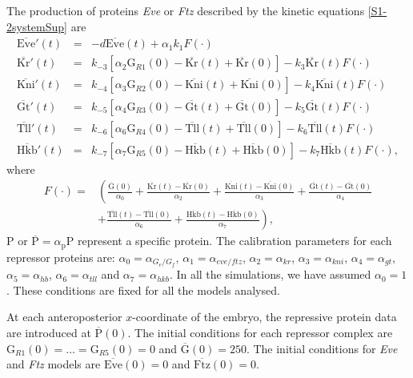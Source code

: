 \documentclass[final,authoryear, 5p, times]{elsarticle}
\begin{document}
The production of proteins \textit{Eve} or \textit{Ftz} described by the kinetic equations \eqref{S1-2systemSup} are
\scriptsize{ $$
\begin{array}{lcl}
    \overline{\text{Eve}}'(t) &= & -d \overline{\text{Eve}}(t) + \alpha _1 k_1 F(\cdot)\\
                  \overline{\text{Kr}}'(t)&=&k_{-3} \left[\alpha _2 \text{G}_{R1}(0)-\overline{\text{Kr}}(t)+\overline{\text{Kr}}(0)\right]-k_3 \overline{\text{Kr}}(t) F(\cdot) \\[5pt]
                          \overline{\text{Kni}}'(t)&=&k_{-4} \left[\alpha_3 \text{G}_{R2}(0)-\overline{\text{Kni}}(t)+\overline{\text{Kni}}(0)\right]-k_4 \overline{\text{Kni}}(t)F(\cdot)\\[5pt]
\overline{\text{Gt}}'(t)&=&k_{-5} \left[\alpha_4 \text{G}_{R3}(0)-\overline{\text{Gt}}(t)+\overline{\text{Gt}}(0)\right]-k_5 \overline{\text{Gt}}(t) F(\cdot)\\[5pt]
        \overline{\text{Tll}}'(t)&=&k_{-6} \left[\alpha_6 \text{G}_{R4}(0)-\overline{\text{Tll}}(t)+\overline{\text{Tll}}(0)\right]-k_6 \overline{\text{Tll}}(t) F(\cdot)\\[5pt]
        \overline{\text{Hkb}}'(t)&=&k_{-7} \left[\alpha_7 \text{G}_{R5}(0)-\overline{\text{Hkb}}(t)+\overline{\text{Hkb}}(0)\right]-k_7 \overline{\text{Hkb}}(t) F(\cdot) ,
\end{array}
$$ }
where
\scriptsize{$$
\begin{array}{ll}
F(\cdot)= & \left(\frac{\overline{\text{G}}(0)}{\alpha_0}+\frac{\overline{\text{Kr}}(t)-\overline{\text{Kr}}(0)}{\alpha_2}+\frac{\overline{\text{Kni}}(t)-\overline{\text{Kni}}(0)}{\alpha_3}+\frac{\overline{\text{Gt}}(t)-\overline{\text{Gt}}(0)}{\alpha_4}\right. \\ & \left. +\frac{\overline{\text{Tll}}(t)-\overline{\text{Tll}}(0)}{\alpha_6}+\frac{\overline{\text{Hkb}}(t)-\overline{\text{Hkb}}(0)}{\alpha_7}  \right),
\end{array}
$$}
P or  $\overline{\text{P}}=\alpha_{\text{p}}\text{P}$ represent a specific protein. The calibration parameters  for each repressor proteins are: $\alpha_0=\alpha_{G_e/G_f}$, $\alpha_1=\alpha_{eve/ftz}$, $\alpha_2=\alpha_{kr}$, $\alpha_3=\alpha_{kni}$, $\alpha_4=\alpha_{gt}$, $\alpha_5=\alpha_{hb}$, $\alpha_6=\alpha_{tll}$ and $\alpha_7=\alpha_{hkb}$. 
In all the simulations, we have assumed $\alpha_0=1$. These conditions are fixed for all the models analysed.

At each anteroposterior $x$-coordinate of the embryo, the repressive protein data are introduced at $\overline{\text{P}}(0)$. The initial conditions for each repressor complex are $\text{G}_{R1}(0)=\ldots =\text{G}_{R5}(0)=0$ and $\overline{\text{G}}(0)=250$. The initial conditions for \textit{Eve} and \textit{Ftz} models are $\overline{\text{Eve}}(0)=0$ and $\overline{\text{Ftz}}(0)=0$.
\end{document}
